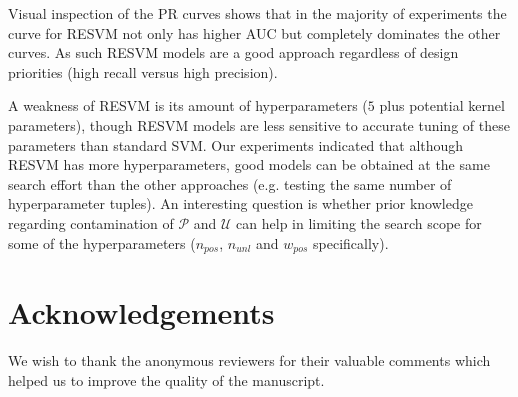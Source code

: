 \documentclass[preprint,elsarticle-num,12pt]{elsarticle}
\begin{document}

Visual inspection of the PR curves shows that in the majority of experiments the curve for RESVM not only has higher AUC but completely dominates the other curves. As such RESVM models are a good approach regardless of design priorities (high recall versus high precision).

A weakness of RESVM is its amount of hyperparameters ($5$ plus potential kernel parameters), though RESVM models are less sensitive to accurate tuning of these parameters than standard SVM. Our experiments indicated that although RESVM has more hyperparameters, good models can be obtained at the same search effort than the other approaches (e.g. testing the same number of hyperparameter tuples). An interesting question is whether prior knowledge regarding contamination of $\mathcal{P}$ and $\mathcal{U}$ can help in limiting the search scope for some of the hyperparameters ($n_{pos}$, $n_{unl}$ and $w_{pos}$ specifically).




\section*{Acknowledgements}
We wish to thank the anonymous reviewers for their valuable comments which helped us to improve the quality of the manuscript.
\end{document}
